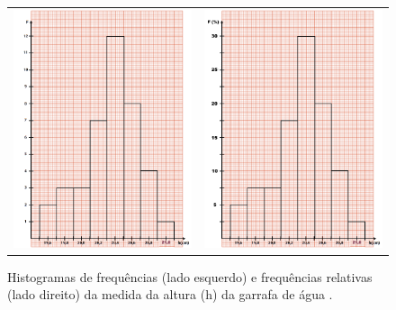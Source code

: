 \begin{figure}[h]
\begin{center}
\begin{tabular}{cc}
\includegraphics[width=8cm]{fig/histoH}&
\includegraphics[width=8cm]{fig/histoHFR}\\
\end{tabular}
\caption{\label{fig:histoexemplo} Histogramas de frequências (lado esquerdo) e frequências relativas (lado direito) da medida da altura (h) da garrafa de água .}
\vspace{-1.cm}
\end{center}
\end{figure}



